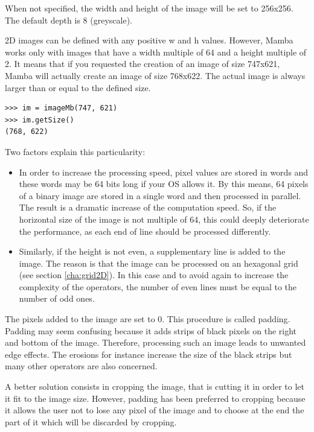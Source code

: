\documentclass[a4paper,10pt,oneside]{article}
\begin{document}
When not specified, the width and height of the image will be set to 
256x256. The default depth is 8 (greyscale).

2D images can be defined with any positive w and h values. However, Mamba
works only with images that have a width multiple of
64 and a height multiple of 2. It means that if you requested the creation of
an image of size 747x621, Mamba will actually create an image of size 768x622. 
The actual image is always larger than or equal to the defined size.

\lstset{language=Python}
\begin{lstlisting}
>>> im = imageMb(747, 621)
>>> im.getSize()
(768, 622) 
\end{lstlisting}

Two factors explain this particularity:

\begin{itemize}
\item In order to increase the processing speed, pixel values are stored in words and these
words may be 64 bits long if your OS allows it. By this means, 64 pixels of a binary image
are stored in a single word and then processed in parallel. The result is a dramatic increase
of the computation speed. So, if the horizontal size of the image is not multiple of 64, this could
deeply deteriorate the performance, as each end of line should be processed differently. 
\item Similarly, if the height is not even, a supplementary line is added to the image. The
reason is that the image can be processed on an hexagonal grid (see section \ref{cha:grid2D}). In this case and to
avoid again to increase the complexity of the operators, the number of even lines must be equal to
the number of odd ones.
\end{itemize}

The pixels added to the image are set to 0. This procedure is called padding. Padding may seem confusing
because it adds strips of black pixels on the right and bottom of the image. Therefore, processing such an
image leads to unwanted edge effects. The erosions for instance increase the size of the black strips
but many other operators are also concerned.

A better solution consists in cropping the image, that is cutting it in order to let it fit to the image size.
However, padding has been preferred to cropping because it allows the user not to lose any pixel of the image
and to choose at the end the part of it which will be discarded by cropping.
\end{document}
